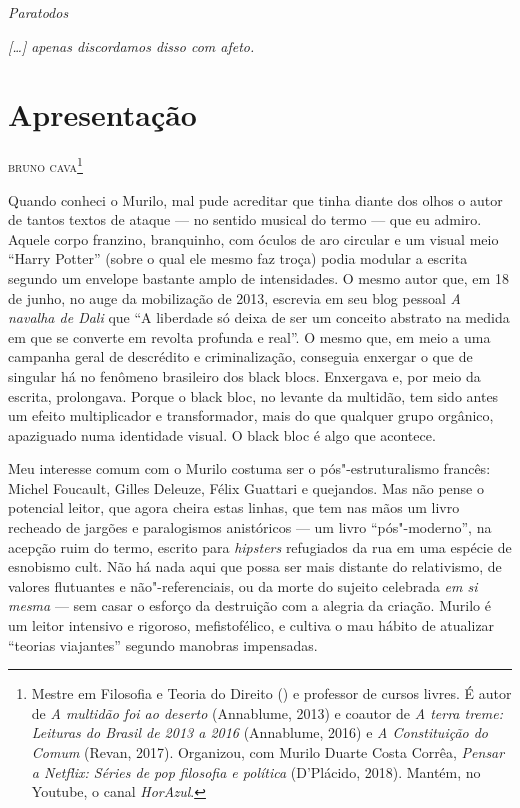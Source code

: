 \pagebreak

\vspace*{\fill}\thispagestyle{empty}
\begin{flushright}
\emph{Paratodos}
\end{flushright}
\pagebreak

\vspace*{\fill}\thispagestyle{empty}
\begin{flushright}
\emph{{[}\ldots{}{]} apenas discordamos disso com afeto.}
\end{flushright}

\chapter*{Apresentação}

\begin{flushright}
\textsc{bruno cava}\footnote{Mestre em Filosofia e Teoria do Direito
() e professor de cursos livres. É autor de \emph{A multidão foi
ao deserto} (Annablume, 2013) e coautor de \emph{A terra treme: Leituras do
Brasil de 2013 a 2016} (Annablume, 2016) e \emph{A Constituição do Comum} (Revan,
2017). Organizou, com Murilo Duarte Costa Corrêa, \emph{Pensar a Netflix: Séries
de pop filosofia e política} (D’Plácido, 2018). Mantém, no Youtube, o
canal \emph{HorAzul}.}
\end{flushright}

Quando conheci o Murilo, mal pude acreditar que tinha diante
dos olhos o autor de tantos textos de ataque --- no sentido musical do
termo --- que eu admiro. Aquele corpo franzino, branquinho, com óculos de
aro circular e um visual meio ``Harry Potter'' (sobre o qual ele mesmo faz
troça) podia modular a escrita segundo um envelope bastante amplo de
intensidades. O mesmo autor que, em 18 de junho, no auge da
mobilização de 2013, escrevia em seu blog pessoal \emph{A navalha de
Dali} que ``A liberdade só deixa de ser um conceito abstrato na medida em
que se converte em revolta profunda e real''. O mesmo que, em meio a uma
campanha geral de descrédito e criminalização, conseguia enxergar o que
de singular há no fenômeno brasileiro dos black blocs. Enxergava e, por
meio da escrita, prolongava. Porque o black bloc, no levante da
multidão, tem sido antes um efeito multiplicador e transformador, mais do que
qualquer grupo orgânico, apaziguado numa identidade visual. O black bloc
é algo que acontece.

Meu interesse comum com o Murilo costuma ser o pós"-estruturalismo
francês: Michel Foucault, Gilles Deleuze, Félix Guattari e quejandos.
Mas não pense o potencial leitor, que agora cheira estas linhas, que tem
nas mãos um livro recheado de jargões e paralogismos anistóricos --- um
livro ``pós"-moderno'', na acepção ruim do termo, escrito para
\emph{hipsters} refugiados da rua em uma espécie de esnobismo cult. Não há nada
aqui que possa ser mais distante do relativismo, de valores flutuantes e
não"-referenciais, ou da morte do sujeito celebrada \emph{em si mesma} ---
sem casar o esforço da destruição com a alegria da criação. Murilo é um
leitor intensivo e rigoroso, mefistofélico, e cultiva o mau hábito de
atualizar ``teorias viajantes'' segundo manobras impensadas.

